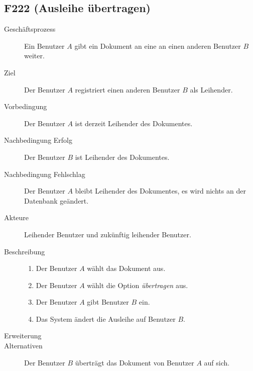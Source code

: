 \subsection{F222 (Ausleihe übertragen)}
\begin{description}
  \item[Geschäftsprozess]Ein Benutzer $A$ gibt ein Dokument an eine an einen anderen Benutzer $B$ weiter.
  \item[Ziel]Der Benutzer $A$ registriert einen anderen Benutzer $B$ als Leihender.
  \item[Vorbedingung]Der Benutzer $A$ ist derzeit Leihender des Dokumentes.
  \item[Nachbedingung Erfolg]Der Benutzer $B$ ist Leihender des Dokumentes.
  \item[Nachbedingung Fehlschlag]Der Benutzer $A$ bleibt Leihender des Dokumentes, es wird nichts an der Datenbank geändert.
  \item[Akteure]Leihender Benutzer und zukünftig leihender Benutzer.
  \item[Beschreibung]\hfill
    \begin{enumerate}
      \item Der Benutzer $A$ wählt das Dokument aus.
      \item Der Benutzer $A$ wählt die Option \emph{übertragen} aus.
      \item Der Benutzer $A$ gibt Benutzer $B$ ein.
      \item Das System ändert die Ausleihe auf Benutzer $B$.
    \end{enumerate}
  \item[Erweiterung]
  \item[Alternativen]Der Benutzer $B$  überträgt das Dokument von Benutzer $A$ auf sich.
\end{description}


